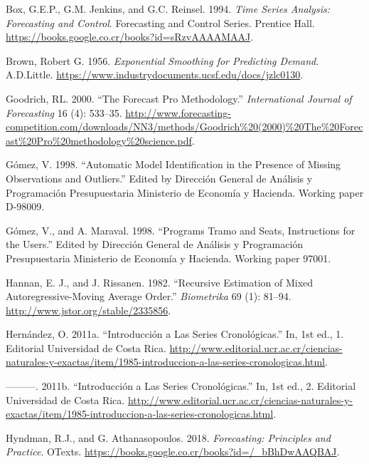 \documentclass[]{article}
\begin{document}
\hypertarget{refs}{}
\leavevmode\hypertarget{ref-box-jenkins}{}%
Box, G.E.P., G.M. Jenkins, and G.C. Reinsel. 1994. \emph{Time Series
Analysis: Forecasting and Control}. Forecasting and Control Series.
Prentice Hall. \url{https://books.google.co.cr/books?id=sRzvAAAAMAAJ}.

\leavevmode\hypertarget{ref-brown}{}%
Brown, Robert G. 1956. \emph{Exponential Smoothing for Predicting
Demand}. A.D.Little.
\url{https://www.industrydocuments.ucsf.edu/docs/jzlc0130}.

\leavevmode\hypertarget{ref-forecastpro}{}%
Goodrich, RL. 2000. ``The Forecast Pro Methodology.''
\emph{International Journal of Forecasting} 16 (4): 533--35.
\url{http://www.forecasting-competition.com/downloads/NN3/methods/Goodrich\%20(2000)\%20The\%20Forecast\%20Pro\%20methodology\%20science.pdf}.

\leavevmode\hypertarget{ref-gomez}{}%
Gómez, V. 1998. ``Automatic Model Identification in the Presence of
Missing Observations and Outliers.'' Edited by Dirección General de
Análisis y Programación Presupuestaria Ministerio de Economía y
Hacienda. Working paper D-98009.

\leavevmode\hypertarget{ref-tramo}{}%
Gómez, V., and A. Maraval. 1998. ``Programs Tramo and Seats,
Instructions for the Users.'' Edited by Dirección General de Análisis y
Programación Presupuestaria Ministerio de Economía y Hacienda. Working
paper 97001.

\leavevmode\hypertarget{ref-hannan}{}%
Hannan, E. J., and J. Rissanen. 1982. ``Recursive Estimation of Mixed
Autoregressive-Moving Average Order.'' \emph{Biometrika} 69 (1): 81--94.
\url{http://www.jstor.org/stable/2335856}.

\leavevmode\hypertarget{ref-oscarh-1}{}%
Hernández, O. 2011a. ``Introducción a Las Series Cronológicas.'' In, 1st
ed., 1. Editorial Universidad de Costa Rica.
\url{http://www.editorial.ucr.ac.cr/ciencias-naturales-y-exactas/item/1985-introduccion-a-las-series-cronologicas.html}.

\leavevmode\hypertarget{ref-oscarh-2}{}%
---------. 2011b. ``Introducción a Las Series Cronológicas.'' In, 1st
ed., 2. Editorial Universidad de Costa Rica.
\url{http://www.editorial.ucr.ac.cr/ciencias-naturales-y-exactas/item/1985-introduccion-a-las-series-cronologicas.html}.

\leavevmode\hypertarget{ref-hyndman2018forecasting}{}%
Hyndman, R.J., and G. Athanasopoulos. 2018. \emph{Forecasting:
Principles and Practice}. OTexts.
\url{https://books.google.co.cr/books?id=/_bBhDwAAQBAJ}.
\end{document}
